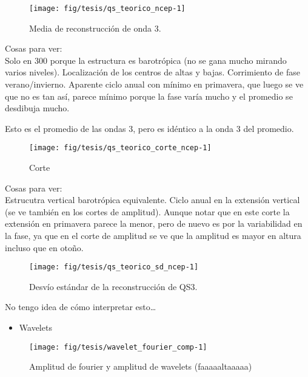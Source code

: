 \documentclass[spanish,a4paper]{book}
\providecommand{\tightlist}{%
  \setlength{\itemsep}{0pt}\setlength{\parskip}{0pt}}
\begin{document}
\begin{figure*}
\texttt{[image: fig/tesis/qs\_teorico\_ncep-1]} \caption{Media de reconstrucción de onda 3.}\label{fig:qs_teorico_ncep}
\end{figure*}

Cosas para ver:\\
Solo en 300 porque la estructura es barotrópica (no se gana mucho
mirando varios niveles). Localización de los centros de altas y bajas.
Corrimiento de fase verano/invierno. Aparente ciclo anual con mínimo en
primavera, que luego se ve que no es tan así, parece mínimo porque la
fase varía mucho y el promedio se desdibuja mucho.

Esto es el promedio de las ondas 3, pero es idéntico a la onda 3 del
promedio.

\begin{figure*}
\texttt{[image: fig/tesis/qs\_teorico\_corte\_ncep-1]} \caption{Corte}\label{fig:qs_teorico_corte_ncep}
\end{figure*}

Cosas para ver:\\
Estrucutra vertical barotrópica equivalente. Ciclo anual en la extensión
vertical (se ve también en los cortes de amplitud). Aunque notar que en
este corte la extensión en primavera parece la menor, pero de nuevo es
por la variabilidad en la fase, ya que en el corte de amplitud se ve que
la amplitud es mayor en altura incluso que en otoño.

\begin{figure*}
\texttt{[image: fig/tesis/qs\_teorico\_sd\_ncep-1]} \caption{Desvío estándar de la reconstrucción de QS3.}\label{fig:qs_teorico_sd_ncep}
\end{figure*}

No tengo idea de cómo interpretar esto\ldots{}

\begin{itemize}
\tightlist
\item
  Wavelets
\end{itemize}

\begin{figure}

{\centering \texttt{[image: fig/tesis/wavelet\_fourier\_comp-1]} 

}

\caption{Amplitud de fourier y amplitud de wavelets (faaaaaltaaaaa)}\label{fig:wavelet_fourier_comp}
\end{figure}
\end{document}
